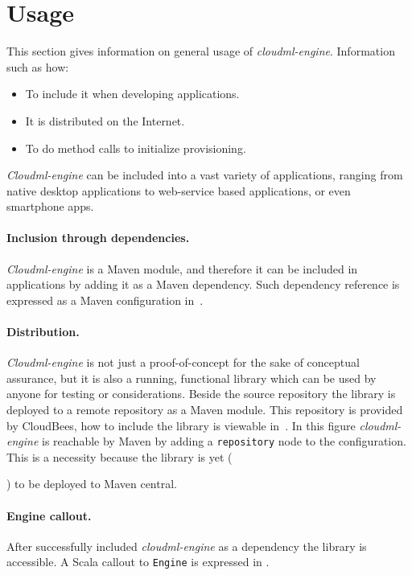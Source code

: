 \section{Usage}

This section gives information on general usage of \emph{cloudml-engine}.
Information such as how: 
\begin{itemize}
  \item To include it when developing applications.
  \item It is distributed on the Internet.
  \item To do method calls to initialize provisioning.
\end{itemize}
\emph{Cloudml-engine} can be included into a vast variety of applications,
ranging from native desktop applications to web-service based applications,
or even smartphone apps.

\paragraph{Inclusion through dependencies.}


\emph{Cloudml-engine} is a Maven module, and therefore it can be included in 
applications by adding it as a Maven dependency.
Such dependency reference is expressed as a Maven configuration in~.

\paragraph{Distribution.}

\emph{Cloudml-engine} is not just a proof-of-concept for the sake of conceptual assurance, but it is 
also a running, functional library which can be used by anyone for testing or considerations.
Beside the source repository\cite{cloudml-engine} the library is deployed to a remote repository
\cite{cloudbees-cloudml-engine} as a Maven module.
This repository is provided by CloudBees, 
how to include the library is viewable in~.
In this figure \emph{cloudml-engine} is reachable by Maven by adding a \texttt{repository} node
to the configuration.
This is a necessity because the library is yet (\date{April 2012}) to be deployed to Maven central.

\paragraph{Engine callout.}


After successfully included \emph{cloudml-engine} as a dependency
the library is accessible.
A Scala callout to \texttt{Engine} is expressed in .
